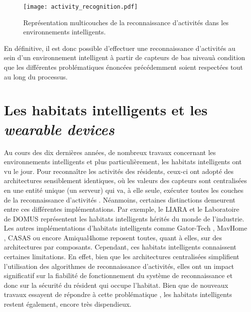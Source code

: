 {{\begin{figure}[H]
	\centering
	\texttt{[image: activity\_recognition.pdf]}
	\caption{Représentation multicouches de la reconnaissance d'activités dans les environnements intelligents.}
	\label{fig:activity_recognition}
\end{figure}

En définitive, il est donc possible d'effectuer une reconnaissance d'activités au sein d'un environnement intelligent à partir de capteurs de bas niveau\textemdash à condition que les différentes problématiques énoncées précédemment soient respectées tout au long du processus.

\section{Les habitats intelligents et les \textit{wearable devices}}

Au cours des dix dernières années, de nombreux travaux concernant les environnements intelligents et plus particulièrement, les habitats intelligents ont vu le jour. Pour reconnaître les activités des résidents, ceux-ci ont adopté des architectures sensiblement identiques, où les valeurs des capteurs sont centralisées en une entité unique (un serveur) qui va, à elle seule, exécuter toutes les couches de la reconnaissance d’activités \citep{Bouchard2014, Hu2016}. Néanmoins, certaines distinctions demeurent entre ces différentes implémentations. Par exemple, le \ac{LIARA} \citep{Bouchard2014} et le Laboratoire de \ac{DOMUS} \citep{Giroux2009} représentent les habitats intelligents hérités du monde de l’industrie. Les autres implémentations d'habitats intelligents comme Gator-Tech \citep{Helal2005}, MavHome \citep{DJCook2003}, CASAS \citep{Cook2013} ou encore Amiqual4home \citep{Lago2017} reposent toutes, quant à elles, sur des architectures par composants. Cependant, ces habitats intelligents connaissent certaines limitations. En effet, bien que les architectures centralisées simplifient l'utilisation des algorithmes de reconnaissance d'activités, elles ont un impact significatif sur la fiabilité de fonctionnement du système de reconnaissance et donc sur la sécurité du résident qui occupe l'habitat. Bien que de nouveaux travaux essayent de répondre à cette problématique \citep{Cook2013, Plantevin2018}, les habitats intelligents restent également, encore très dispendieux.

}}
